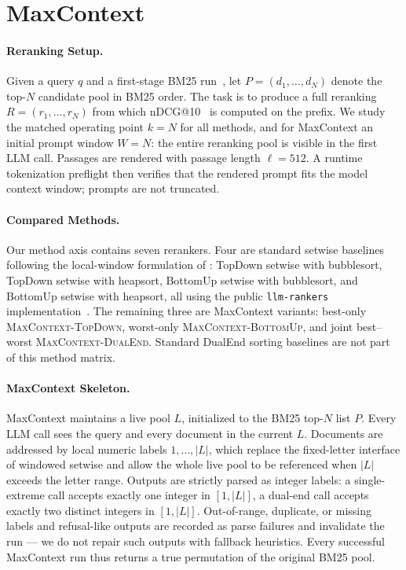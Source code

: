 \section{MaxContext}
\label{sec:methodology}


\paragraph{Reranking Setup.}
Given a query $q$ and a first-stage BM25 run~\citep{robertson2009probabilistic}, let $P=(d_1,\ldots,d_N)$ denote the top-$N$ candidate pool in BM25 order. The task is to produce a full reranking $R=(r_1,\ldots,r_N)$ from which nDCG@10~\citep{jarvelin2002cumulated} is computed on the prefix. We study the matched operating point $k=N$ for all methods, and for MaxContext an initial prompt window $W=N$: the entire reranking pool is visible in the first LLM call. Passages are rendered with passage length $\ell{=}512$. A runtime tokenization preflight then verifies that the rendered prompt fits the model context window; prompts are not truncated.

\paragraph{Compared Methods.}
Our method axis contains seven rerankers. Four are standard setwise baselines following the local-window formulation of \citet{zhuang2024setwise}: TopDown setwise with bubblesort, TopDown setwise with heapsort, BottomUp setwise with bubblesort, and BottomUp setwise with heapsort, all using the public \texttt{llm-rankers} implementation~\citep{ielab_llmrankers}. The remaining three are MaxContext variants: best-only \textsc{MaxContext-TopDown}, worst-only \textsc{MaxContext-BottomUp}, and joint best--worst \textsc{MaxContext-DualEnd}. Standard DualEnd sorting baselines are not part of this method matrix.

\paragraph{MaxContext Skeleton.}
MaxContext maintains a live pool $L$, initialized to the BM25 top-$N$ list $P$. Every LLM call sees the query and every document in the current $L$. Documents are addressed by local numeric labels $1,\ldots,|L|$, which replace the fixed-letter interface of windowed setwise and allow the whole live pool to be referenced when $|L|$ exceeds the letter range. Outputs are strictly parsed as integer labels: a single-extreme call accepts exactly one integer in $[1,|L|]$, a dual-end call accepts exactly two distinct integers in $[1,|L|]$. Out-of-range, duplicate, or missing labels and refusal-like outputs are recorded as parse failures and invalidate the run --- we do not repair such outputs with fallback heuristics. Every successful MaxContext run thus returns a true permutation of the original BM25 pool.


